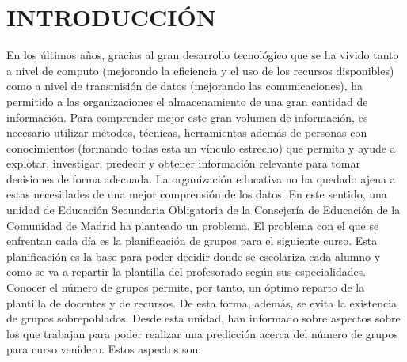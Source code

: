 \documentclass[spanish,12pt, a4paper,twoside]{paper}
\let\oldsection\section
\def\section{\cleardoublepage\oldsection}
\begin{document}
\section{INTRODUCCIÓN}
\justify
En los últimos años, gracias al gran desarrollo tecnológico que se ha vivido tanto a nivel de computo (mejorando la eficiencia y el uso de los recursos disponibles) como a nivel de transmisión de datos (mejorando las comunicaciones), ha permitido a las organizaciones el almacenamiento de una gran cantidad de información.
\justify
Para comprender mejor este gran volumen de información, es necesario utilizar métodos, técnicas, herramientas además de personas con conocimientos (formando todas esta un vínculo estrecho) que permita y ayude a explotar, investigar, predecir y obtener información relevante para tomar decisiones de forma adecuada.
\justify
La organización educativa no ha quedado ajena a estas necesidades de una mejor comprensión de los datos. En este sentido, una unidad de Educación Secundaria Obligatoria de la Consejería de Educación de la Comunidad de Madrid ha planteado un problema.
\justify
El problema con el que se enfrentan cada día es la planificación de grupos para el siguiente curso. Esta planificación es la base para poder decidir donde se escolariza cada alumno y como se va a repartir la plantilla del profesorado según sus especialidades. Conocer el número de grupos permite, por tanto, un óptimo reparto de la plantilla de docentes y de recursos. De esta forma, además, se evita la existencia de grupos sobrepoblados.
\justify
Desde esta unidad, han informado sobre aspectos sobre los que trabajan para poder realizar una predicción acerca del número de grupos para curso venidero. 
\justify
Estos aspectos son:
\justify
\end{document}
